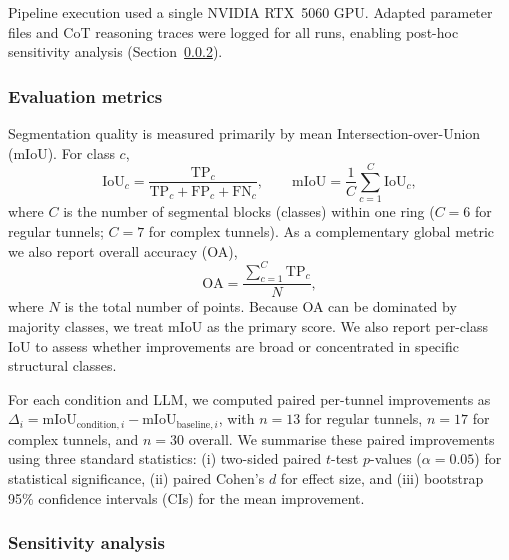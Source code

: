\documentclass[a4paper,fleqn]{cas-dc}
\begin{document}
Pipeline execution used a single NVIDIA RTX~5060 GPU. Adapted parameter files and CoT reasoning traces were logged for all runs, enabling post-hoc sensitivity analysis (Section~\ref{sec:sensitivity-method}).

\subsubsection{Evaluation metrics}\label{sec:metrics}

Segmentation quality is measured primarily by mean Intersection-over-Union (mIoU). For class $c$,
\begin{equation}
\text{IoU}_c = \frac{\text{TP}_c}{\text{TP}_c + \text{FP}_c + \text{FN}_c}, \qquad
\text{mIoU} = \frac{1}{C} \sum_{c=1}^{C} \text{IoU}_c,
\end{equation}
where $C$ is the number of segmental blocks (classes) within one ring ($C=6$ for regular tunnels; $C=7$ for complex tunnels). As a complementary global metric we also report overall accuracy (OA),
\begin{equation}
\text{OA} = \frac{\sum_{c=1}^{C} \text{TP}_c}{N},
\end{equation}
where $N$ is the total number of points. Because OA can be dominated by majority classes, we treat mIoU as the primary score. We also report per-class IoU to assess whether improvements are broad or concentrated in specific structural classes.

For each condition and LLM, we computed paired per-tunnel improvements as $\Delta_i = \mathrm{mIoU}_{\text{condition},i} - \mathrm{mIoU}_{\text{baseline},i}$, with $n=13$ for regular tunnels, $n=17$ for complex tunnels, and $n=30$ overall. We summarise these paired improvements using three standard statistics: (i) two-sided paired $t$-test $p$-values ($\alpha = 0.05$) for statistical significance, (ii) paired Cohen's \mbox{$d$} for effect size, and (iii) bootstrap 95\% confidence intervals (CIs) for the mean improvement.

\subsubsection{Sensitivity analysis}\label{sec:sensitivity-method}
\end{document}
